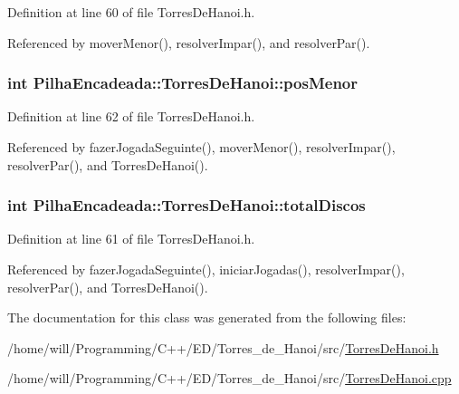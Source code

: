 Definition at line 60 of file TorresDeHanoi.h.



Referenced by moverMenor(), resolverImpar(), and resolverPar().

\hypertarget{classPilhaEncadeada_1_1TorresDeHanoi_a28255ab87785e3120e22c07ffb401f79}{
\subsubsection[{posMenor}]{\setlength{\rightskip}{0pt plus 5cm}int {\bf PilhaEncadeada::TorresDeHanoi::posMenor}}}
\label{classPilhaEncadeada_1_1TorresDeHanoi_a28255ab87785e3120e22c07ffb401f79}


Definition at line 62 of file TorresDeHanoi.h.



Referenced by fazerJogadaSeguinte(), moverMenor(), resolverImpar(), resolverPar(), and TorresDeHanoi().

\hypertarget{classPilhaEncadeada_1_1TorresDeHanoi_a2cf03283a56bd5210894ca7aced61786}{
\subsubsection[{totalDiscos}]{\setlength{\rightskip}{0pt plus 5cm}int {\bf PilhaEncadeada::TorresDeHanoi::totalDiscos}}}
\label{classPilhaEncadeada_1_1TorresDeHanoi_a2cf03283a56bd5210894ca7aced61786}


Definition at line 61 of file TorresDeHanoi.h.



Referenced by fazerJogadaSeguinte(), iniciarJogadas(), resolverImpar(), resolverPar(), and TorresDeHanoi().



The documentation for this class was generated from the following files:\begin{DoxyCompactItemize}
\item 
/home/will/Programming/C++/ED/Torres\_\-de\_\-Hanoi/src/\hyperlink{TorresDeHanoi_8h}{TorresDeHanoi.h}\item 
/home/will/Programming/C++/ED/Torres\_\-de\_\-Hanoi/src/\hyperlink{TorresDeHanoi_8cpp}{TorresDeHanoi.cpp}\end{DoxyCompactItemize}
